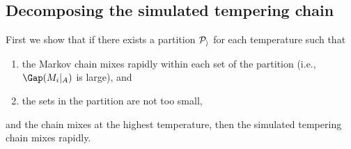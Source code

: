 


\subsection{Decomposing the simulated tempering chain} 
\label{sec:decomposition}
First we show that if
there exists a partition $\cal P_i$ for each temperature %
such that
\begin{enumerate}
\item
the Markov chain mixes rapidly within each set of the partition (i.e., $\Gap(M_i|_A)$ is large), and
\item
the sets in the partition are not too small,
\end{enumerate}
and the chain mixes at the highest temperature, 
then the simulated tempering chain mixes rapidly. %


